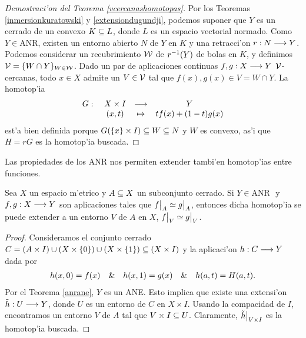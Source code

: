 \begin{proof}[Demostraci'on del Teorema \ref{vcercanashomotopas}]
  Por los Teoremas \ref{inmersionkuratowski} y \ref{extensiondugundji}, podemos suponer que $ Y  $ es un cerrado de un convexo $ K\subseteq L  $, donde $ L  $ es un espacio vectorial normado. Como $ Y\in \text{ANR} $, existen un entorno abierto $ N  $ de $ Y  $ en $ K  $ y una retracci'on $ r: N\longrightarrow Y  $. Podemos considerar un recubrimiento $ \mathcal{W}  $ de $ r^{-1} (Y)  $ de bolas en $ K  $, y definimos $ \mathcal{V}  = \{W\cap Y \}_{W\in \mathcal{W} } $. Dado un par de aplicaciones continuas $ f,g:X\longrightarrow Y  $ $ \mathcal{V}  $-cercanas, todo $ x\in X  $ admite un $ V\in \mathcal{V}  $ tal que $ f(x),g(x)\in V = W\cap Y  $. La homotop'ia
  \begin{gather*}
    \begin{matrix}
    G : \ &X\times I  &\longrightarrow &Y  \\
    &(x,t) &\mapsto &tf(x) +(1-t)g(x) 
    \end{matrix}
  \end{gather*}
  est'a bien definida porque $ G(\{x\}\times I )\subseteq W \subseteq N  $ y $ W  $ es convexo, as'i que $ H = rG  $ es la homotop'ia buscada.
\end{proof}
Las propiedades de los ANR nos permiten extender tambi'en homotop'ias entre funciones.

\begin{theorem}\label{extensionhomotopia}
  Sea $ X  $ un espacio m'etrico y $ A\subseteq X  $ un subconjunto cerrado. Si $ Y\in \text{ANR } $ y $ f,g:X\longrightarrow Y  $ son aplicaciones tales que $ \rest{f }{A }\simeq \rest{g }{A } $, entonces dicha homotop'ia se puede extender a un entorno $ V  $ de $ A  $ en $ X  $, $ \rest{f }{V }\simeq \rest{g }{V } $.
\end{theorem}
\begin{proof}
  Consideramos el conjunto cerrado $ C = (A\times I)\cup(X\times\{0 \})\cup (X\times\{1\}) \subseteq (X\times I )$ y la aplicaci'on $ h:C\longrightarrow Y  $ dada por 
  \begin{gather*}
    h(x,0) = f(x)\quad \& \quad h(x,1) = g(x) \quad \&\quad h(a,t) = H(a,t).
  \end{gather*}
  Por el Teorema \ref{anrane}, $ Y  $ es un ANE. Esto implica que existe una extensi'on $ \tilde{h}:U\longrightarrow Y  $, donde $ U  $ es un entorno de $ C  $ en $ X\times I  $. Usando la compacidad de $ I  $, encontramos un entorno $ V  $ de $ A  $ tal que $ V\times I\subseteq U  $. Claramente, $ \rest{\tilde{h}}{V\times I   } $ es la homotop'ia buscada.
\end{proof}

